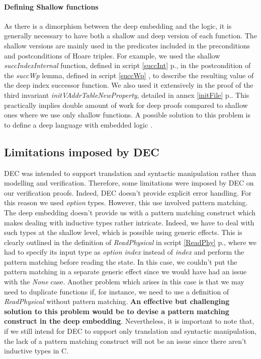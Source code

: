 \paragraph{Defining Shallow functions}
As there is a dimorphism  between the deep embedding and the logic, it is generally necessary to have both a shallow and deep version of each function. The shallow versions are mainly used in the predicates included in the preconditions and postconditions of Hoare triples. For example, we used the shallow \textit{succIndexInternal} function, defined in script \ref{succInt} p.\pageref{succInt}, in the postcondition of the \textit{succWp} lemma, defined in script \ref{succWp} \pageref{succWp}, to describe the resulting value of the deep index successor function. We also used it extensively in the proof of the third invariant \textit{initVAddrTableNewProperty}, detailed in annex \ref{initFile} p.\pageref{initFile}. This practically implies double amount of work for deep proofs compared to shallow ones where we use only shallow functions. A possible solution to this problem is to define a deep language with embedded logic \cite[Hoare Logic (Part II)]{SoftwareFoundation}. 

\subsection{Limitations imposed by DEC} \label{limitations}
DEC was intended to support translation and syntactic manipulation rather than modelling and verification. Therefore, some limitations were imposed by DEC on our verification proofs. Indeed, DEC doesn't provide explicit error handling. For this reason we used \textit{option} types. However, this use involved pattern matching. The deep embedding doesn't provide us with a pattern matching construct which makes dealing with inductive types rather intricate. Indeed, we have to deal with such types at the shallow level, which is possible using generic effects. This is clearly outlined in the definition of \textit{ReadPhysical} in script \ref{ReadPhy} p.\pageref{ReadPhy}, where we had to specify its input type as \textit{option index} instead of \textit{index} and perform the pattern matching before reading the state. In this case, we couldn't put the pattern matching in a separate generic effect since we would have had an issue with the \textit{None} case. Another problem which arises in this case is that we may need to duplicate functions if, for instance, we need to use a definition of \textit{ReadPhysical} without pattern matching. \textbf{An effective but challenging solution to this problem would be to devise a pattern matching construct in the deep embedding}. Nevertheless, it is important to note that, if we still intend for DEC to support only  translation and syntactic manipulation, the lack of a pattern matching construct will not be an issue since there aren't inductive types in C. 

